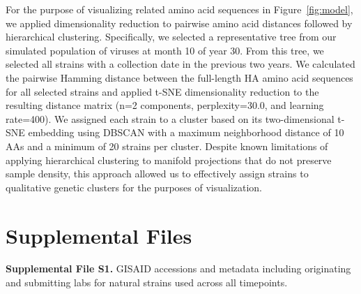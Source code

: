 For the purpose of visualizing related amino acid sequences in Figure~\ref{fig:model}, we applied dimensionality reduction to pairwise amino acid distances followed by hierarchical clustering.
Specifically, we selected a representative tree from our simulated population of viruses at month 10 of year 30.
From this tree, we selected all strains with a collection date in the previous two years.
We calculated the pairwise Hamming distance between the full-length HA amino acid sequences for all selected strains and applied t-SNE dimensionality reduction \citep{vanDerMaaten2008} to the resulting distance matrix (n=2 components, perplexity=30.0, and learning rate=400).
We assigned each strain to a cluster based on its two-dimensional t-SNE embedding using DBSCAN \citep{Ester1996} with a maximum neighborhood distance of 10 AAs and a minimum of 20 strains per cluster.
Despite known limitations of applying hierarchical clustering to manifold projections that do not preserve sample density, this approach allowed us to effectively assign strains to qualitative genetic clusters for the purposes of visualization.

\section*{Supplemental Files}

\textbf{Supplemental File S1.} GISAID accessions and metadata including originating and submitting labs for natural strains used across all timepoints.
